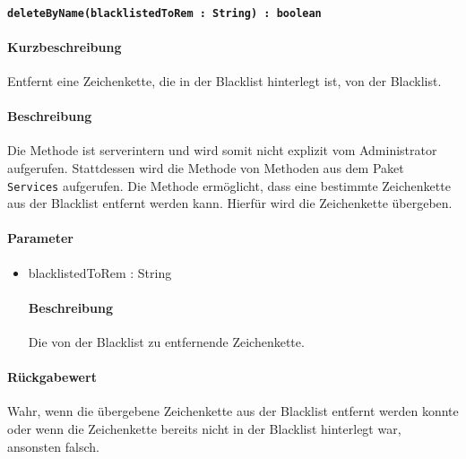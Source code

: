 \paragraph{\texttt{deleteByName(blacklistedToRem : String) : boolean}}%
\paragraph*{Kurzbeschreibung}
Entfernt eine Zeichenkette, die in der Blacklist hinterlegt ist, von der Blacklist.
\paragraph*{Beschreibung}
Die Methode ist serverintern und wird somit nicht explizit vom Administrator aufgerufen.
Stattdessen wird die Methode von Methoden aus dem Paket \texttt{Services} aufgerufen.
Die Methode ermöglicht, dass eine bestimmte Zeichenkette aus der Blacklist entfernt werden kann.
Hierfür wird die Zeichenkette übergeben.
\paragraph*{Parameter}
\begin{itemize}
    \item blacklistedToRem : String
    		\paragraph*{Beschreibung}
    		Die von der Blacklist zu entfernende Zeichenkette.
\end{itemize}
\paragraph*{Rückgabewert}
Wahr, wenn die übergebene Zeichenkette aus der Blacklist entfernt werden konnte oder wenn die Zeichenkette bereits nicht in der Blacklist hinterlegt war, ansonsten falsch.
